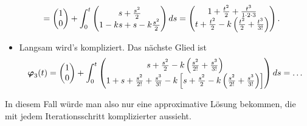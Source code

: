 \begin{Beispiel}
\begin{itemize}
\begin{align*}
        &=\begin{pmatrix}1\\0\end{pmatrix}+\int_0^t\begin{pmatrix}s+\frac{s^2}{2}\\1-ks+s-k\frac{s^2}{2}\end{pmatrix}ds=\begin{pmatrix}1+\frac{t^2}{2}+\frac{t^3}{1\cdot2\cdot3}\\t+\frac{t^2}{2}-k\left({\frac{t^2}{2}+\frac{t^3}{3!}}\right)\end{pmatrix}.
    \end{align*}
    \item Langsam wird's kompliziert. Das nächste Glied ist
    \begin{equation*}
        {{\text{\boldmath${\varphi}$}}}_3(t)=\begin{pmatrix}1\\0\end{pmatrix}+\int_0^t\begin{pmatrix}s+\frac{s^2}{2}-k\left({\frac{s^2}{2!}+\frac{s^3}{3!}}\right)\\1+s+\frac{s^2}{2!}+\frac{s^3}{3!}-k\left[{s+\frac{s^2}{2}-k\left({\frac{s^2}{2!}+\frac{s^3}{3!}}\right)}\right]\end{pmatrix}ds=\ldots
    \end{equation*}
\end{itemize}
In diesem Fall würde man also nur eine approximative Lösung bekommen, die mit jedem Iterationsschritt komplizierter aussieht.
\end{Beispiel}
